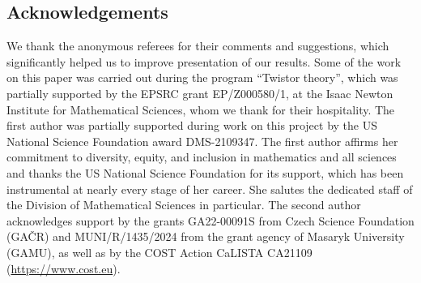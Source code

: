 \documentclass[pdftex]{sigma}
\numberwithin{equation}{section}
\theoremstyle{definition}
\begin{document}
\subsection*{Acknowledgements}
We thank the anonymous referees for their comments and suggestions, which significantly helped us to improve presentation of our results.
Some of the work on this paper was carried out during the program ``Twistor theory'', which was partially supported by the EPSRC grant EP/Z000580/1, at the Isaac Newton Institute for Mathematical Sciences, whom we thank for their hospitality. The first author was partially supported during work on this project by the US National Science Foundation award DMS-2109347. The first author affirms her commitment to diversity, equity, and inclusion in mathematics and all sciences and thanks the US National Science Foundation for its support, which has been instrumental at nearly every stage of her career. She salutes the dedicated staff of the Division of Mathematical Sciences in particular. The second author acknowledges support by the grants GA22-00091S from Czech Science Foundation (GA\v CR) and MUNI/R/1435/2024 from the grant agency of Masaryk University (GAMU), as well as by the COST Action CaLISTA CA21109 (\url{https://www.cost.eu}).
\end{document}
